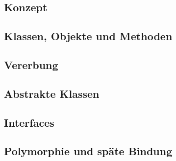 
\subsection{Konzept}

\subsection{Klassen, Objekte und Methoden}

\subsection{Vererbung}

\subsection{Abstrakte Klassen}

\subsection{Interfaces}

\subsection{Polymorphie und späte Bindung}
